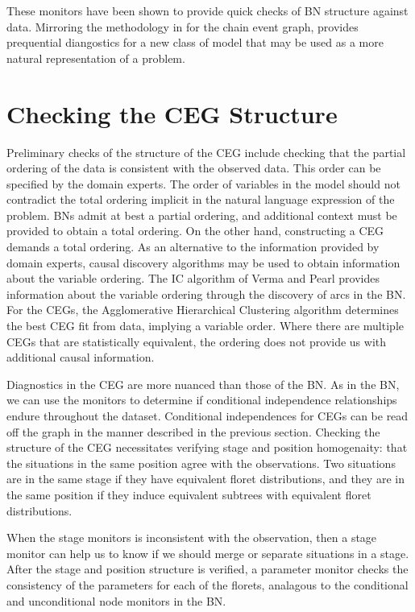 \documentclass[12pt]{article}
\begin{document}
These monitors have been shown to provide quick checks of BN structure against data. %
Mirroring the methodology in \cite{diagnostics} for the chain event graph, provides prequential diangostics for a new class of model that may be used as a more natural representation of a problem. 

\section{Checking the CEG Structure}

Preliminary checks of the structure of the CEG include checking that the partial ordering of the data is consistent with the observed data. This order can be specified by the domain experts. The order of variables in the model should not contradict the total ordering implicit in the natural language expression of the problem. BNs admit at best a partial ordering, and additional context must be provided to obtain a total ordering. On the other hand, constructing a CEG demands a total ordering.
As an alternative to the information provided by domain experts, causal discovery algorithms may be used to obtain information about the variable ordering. The IC algorithm of Verma and Pearl provides information about the variable ordering through the discovery of arcs in the BN. For the CEGs, the Agglomerative Hierarchical Clustering algorithm determines the best CEG fit from data, implying a variable order.  Where there are multiple CEGs that are statistically equivalent, the ordering does not provide us with additional causal information. %

Diagnostics in the CEG are more nuanced than those of the BN. As in the BN, we can use the monitors to determine if conditional independence relationships endure throughout the dataset. Conditional independences for CEGs can be read off the graph in the manner described in the previous section. %
Checking the structure of the CEG necessitates verifying stage and position homogenaity: that the situations in the same position agree with the observations. Two situations are in the same stage if they have equivalent floret distributions, and they are in the same position if they induce equivalent subtrees with equivalent floret distributions. 

When the stage monitors is inconsistent with the observation, then a stage monitor can help us to know if we should merge or separate situations in a stage. 
After the stage and position structure is verified, a parameter monitor checks the consistency of the parameters for each of the florets, analagous to the conditional and unconditional node monitors in the BN. 
 
\end{document}
